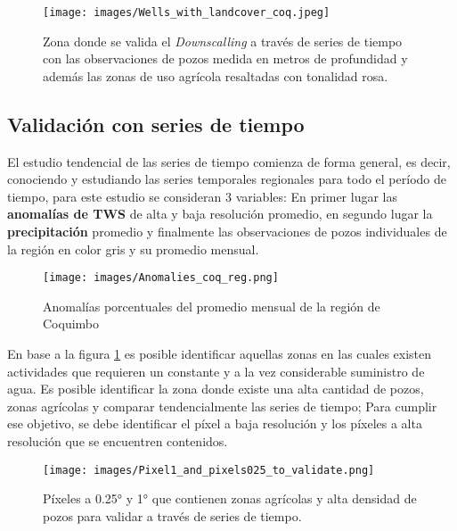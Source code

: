 \begin{figure}[H]
    \centering
          \texttt{[image: images/Wells\_with\_landcover\_coq.jpeg]}
          \vskip -0.1in
    \caption[Zona de validación con series de tiempo]{\footnotesize Zona donde se valida el \textit{Downscalling} a través de series de tiempo con las observaciones de pozos medida en metros de profundidad y además las zonas de uso agrícola resaltadas con tonalidad rosa.}
    \label{szcoq}
\end{figure}
\subsection{Validación con series de tiempo}
El estudio tendencial de las series de tiempo comienza de forma general, es decir, conociendo y estudiando las series temporales regionales para todo el período de tiempo, para este estudio se consideran 3 variables: En primer lugar las \textbf{anomalías de TWS} de alta y baja resolución promedio, en segundo lugar la 
\textbf{precipitación} promedio y finalmente las observaciones de pozos individuales de la región en color gris y su promedio mensual.

\begin{figure}[H]
    \centering
          \texttt{[image: images/Anomalies\_coq\_reg.png]}
          \vskip -0.1in
    \caption[Series de tiempo para la región de Coquimbo]{\footnotesize Anomalías porcentuales del promedio mensual de la región de Coquimbo}
    \label{tscoq}
\end{figure}

En base a la figura \ref{szcoq} es posible identificar aquellas zonas en las cuales existen actividades que requieren un constante y a la vez considerable suministro de agua. Es posible identificar la zona donde existe una alta cantidad de pozos, zonas agrícolas y comparar
tendencialmente las series de tiempo; Para cumplir ese objetivo, se debe identificar el píxel a baja resolución y los píxeles a alta resolución que se encuentren contenidos.

\begin{figure}[H]
    \centering
          \texttt{[image: images/Pixel1\_and\_pixels025\_to\_validate.png]}
          \vskip -0.1in
    \caption[Píxeles a 0.25° y 1° que contienen zonas agrícolas y alta densidad de pozos]{\footnotesize Píxeles a 0.25° y 1° que contienen zonas agrícolas y alta densidad de pozos para validar a través de series de tiempo.}
    \label{pixelscoq}
\end{figure}

